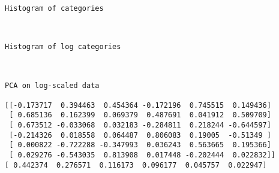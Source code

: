 \documentclass{article}
\begin{document}
    \begin{Verbatim}[commandchars=\\\{\}]
Histogram of categories
    \end{Verbatim}

    \begin{center}
    \end{center}
    { \hspace*{\fill} \\}
    
    \begin{Verbatim}[commandchars=\\\{\}]
Histogram of log categories
    \end{Verbatim}

    \begin{center}
    \end{center}
    { \hspace*{\fill} \\}
    
    \begin{Verbatim}[commandchars=\\\{\}]
PCA on log-scaled data

[[-0.173717  0.394463  0.454364 -0.172196  0.745515  0.149436]
 [ 0.685136  0.162399  0.069379  0.487691  0.041912  0.509709]
 [ 0.673512 -0.033068  0.032183 -0.284811  0.218244 -0.644597]
 [-0.214326  0.018558  0.064487  0.806083  0.19005  -0.51349 ]
 [ 0.000822 -0.722288 -0.347993  0.036243  0.563665  0.195366]
 [ 0.029276 -0.543035  0.813908  0.017448 -0.202444  0.022832]]
[ 0.442374  0.276571  0.116173  0.096177  0.045757  0.022947]
    \end{Verbatim}

    \begin{center}
    \end{center}
    { \hspace*{\fill} \\}
    
    \begin{center}
    \end{center}
    { \hspace*{\fill} \\}
    
\end{document}
